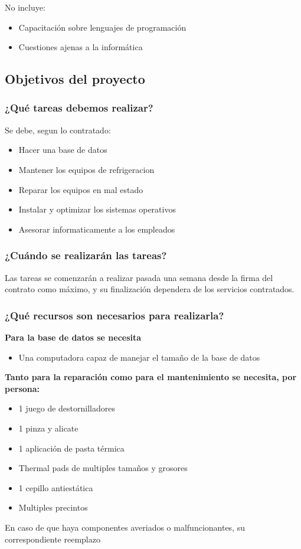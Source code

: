 \documentclass{article}
\begin{document}
			No incluye:
			\begin{itemize}
			\item Capacitación sobre lenguajes de programación
			\item Cuestiones ajenas a la informática
			\end{itemize}
	\subsection{Objetivos del proyecto}
		\subsubsection{¿Qué tareas debemos realizar?}
			Se debe, segun lo contratado:
			\begin{itemize}
			\item Hacer una base de datos
			\item Mantener los equipos de refrigeracion
			\item Reparar los equipos en mal estado
			\item Instalar y optimizar los sistemas operativos
			\item Asesorar informaticamente a los empleados
			\end{itemize}
			
		\subsubsection{¿Cuándo se realizarán las tareas?}
			Las tareas se comenzarán a realizar pasada una semana desde la firma del contrato 
			como máximo, y su finalización dependera de los servicios contratados.
			
		\subsubsection{¿Qué recursos son necesarios para realizarla?}
			\textbf{Para la base de datos se necesita}
			\begin{itemize}
			\item Una computadora capaz de manejar el tamaño de la base de datos\\
			\end{itemize}
			
			\textbf{Tanto para la reparación como para el mantenimiento se necesita, por persona:}
			\begin{itemize}
			\item 1 juego de destornilladores
			\item 1 pinza y alicate
			\item 1 aplicación de pasta térmica
			\item Thermal pads de multiples tamaños y grosores
			\item 1 cepillo antiestática
			\item Multiples precintos
			\end{itemize}
			En caso de que haya componentes averiados o malfuncionantes, su correspondiente reemplazo\\
			
\end{document}
